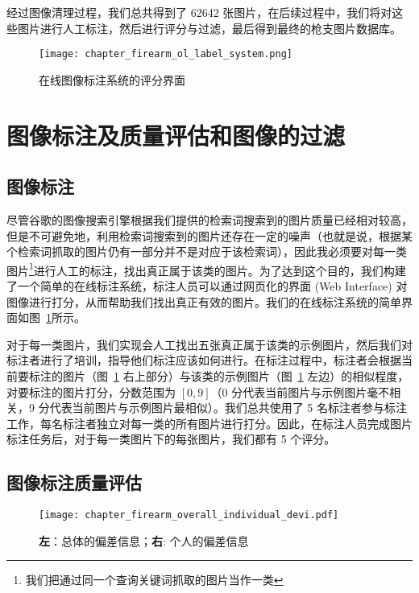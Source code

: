 经过图像清理过程，我们总共得到了 62642 张图片，在后续过程中，我们将对这些图片进行人工标注，然后进行评分与过滤，最后得到最终的枪支图片数据库。
\begin{figure}[t]
	\centering
	\texttt{[image: chapter\_firearm\_ol\_label\_system.png]}
	\caption{在线图像标注系统的评分界面}
	\label{fig:online_label_system}
\end{figure}

\section{图像标注及质量评估和图像的过滤}\label{sec:image_label_filtering}

\subsection{图像标注}
尽管谷歌的图像搜索引擎根据我们提供的检索词搜索到的图片质量已经相对较高，但是不可避免地，利用检索词搜索到的图片还存在一定的噪声（也就是说，根据某个检索词抓取的图片仍有一部分并不是对应于该检索词），因此我必须要对每一类图片\footnote{我们把通过同一个查询关键词抓取的图片当作一类}进行人工的标注，找出真正属于该类的图片。为了达到这个目的，我们构建了一个简单的在线标注系统，标注人员可以通过网页化的界面 (Web Interface) 对图像进行打分，从而帮助我们找出真正有效的图片。我们的在线标注系统的简单界面如图~\ref{fig:online_label_system}所示。


对于每一类图片，我们实现会人工找出五张真正属于该类的示例图片，然后我们对标注者进行了培训，指导他们标注应该如何进行。在标注过程中，标注者会根据当前要标注的图片（图~\ref{fig:online_label_system} 右上部分）与该类的示例图片（图~\ref{fig:online_label_system} 左边）的相似程度，对要标注的图片打分，分数范围为 $[0,9]$（0 分代表当前图片与示例图片毫不相关，9 分代表当前图片与示例图片最相似）。我们总共使用了 5 名标注者参与标注工作，每名标注者独立对每一类的所有图片进行打分。因此，在标注人员完成图片标注任务后，对于每一类图片下的每张图片，我们都有 5 个评分。

\subsection{图像标注质量评估}

\begin{figure}[t]
	\centering
	\texttt{[image: chapter\_firearm\_overall\_individual\_devi.pdf]}
	\caption{\textbf{左}：总体的偏差信息；\textbf{右}: 个人的偏差信息}
	\label{fig:deviation_info}
\end{figure}


